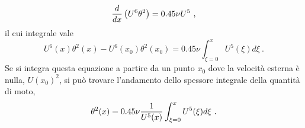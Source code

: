 \begin{equation}
 \frac{d}{dx} \left( U^6 \theta^2 \right) = 0.45 \nu U^5 \ ,
\end{equation}
il cui integrale vale
\begin{equation}
 U^6(x)\theta^2(x) - U^6(x_0)\theta^2(x_0) = 0.45 \nu \int_{\xi=0}^{x} U^5(\xi) d\xi \ .
\end{equation}
Se si integra questa equazione a partire da un punto $x_0$ dove la velocità esterna è nulla, $U(x_0)^2$, si può trovare l'andamento dello spessore integrale della quantità di moto,
\begin{equation}
 \theta^2(x) = 0.45 \nu \frac{1}{U^5(x)} \int_{\xi=0}^{x} U^5(\xi) d\xi \ .
\end{equation}

